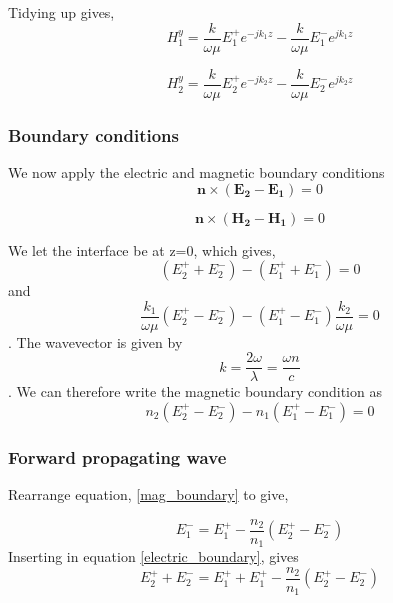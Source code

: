 \documentclass[11pt]{article}
\begin{document}
Tidying up gives,
\begin{equation}
H^{y}_{1}=\frac{k}{\omega \mu}E^{+}_{1} e^{-j k_1 z}-\frac{k}{\omega \mu} E^{-}_{1} e^{j k_1 z}
\end{equation}

\begin{equation}
H^{y}_{2}=\frac{k}{\omega \mu}E^{+}_{2} e^{-j k_2 z}-\frac{k}{\omega \mu} E^{-}_{2} e^{j k_2 z}
\end{equation}

\subsubsection{Boundary conditions}
We now apply the electric and magnetic boundary conditions\cite{0953-8984-25-21-215301}
\begin{equation}
\mathbf{n} \times (\mathbf{E_2}-\mathbf{E_1})=0
\end{equation}

\begin{equation}
\mathbf{n} \times (\mathbf{H_2}-\mathbf{H_1})=0
\end{equation}

We let the interface be at z=0, which gives,
\begin{equation}
(E_{2}^{+}+E_{2}^{-})-(E_{1}^{+}+E_{1}^{-})=0
\label{electric_boundary}
\end{equation}
and
\begin{equation}
\frac{k_1}{\omega \mu}(E_{2}^{+}-E_{2}^{-})-(E_{1}^{+}-E_{1}^{-})\frac{k_2}{\omega \mu}=0
\end{equation}
.
The wavevector is given by
\begin{equation}
k=\frac{2 \omega }{\lambda}=\frac{\omega n}{c}
\end{equation}
.
We can therefore write the magnetic boundary condition as
\begin{equation}
n_2 (E_{2}^{+}-E_{2}^{-}) - n_1 (E_{1}^{+}-E_{1}^{-})=0
\label{mag_boundary}
\end{equation}

\subsubsection{Forward propagating wave}
Rearrange equation, \ref{mag_boundary} to give,

\begin{equation}
E_{1}^{-} = E_{1}^{+}-\frac{n_2}{n_1}(E_{2}^{+}-E_{2}^{-})
\end{equation}
Inserting in equation \ref{electric_boundary}, gives 
\begin{equation}
E_{2}^{+}+E_{2}^{-}=E_{1}^{+}+E_{1}^{+}-\frac{n_2}{n_1}(E_{2}^{+}-E_{2}^{-})
\end{equation}
\end{document}

